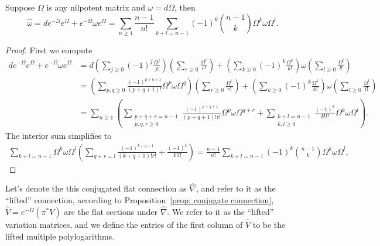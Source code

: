\begin{lemma}
Suppose $\Omega$ is any nilpotent matrix and $\omega=d \Omega$, then
\begin{equation}\label{eq:OmegaHatFormula}
\widehat{\omega}=d e^{-\Omega}e^\Omega+e^{-\Omega}\omega e^\Omega=\sum_{n\geq1}\frac{n-1}{n!}\sum_{k+l=n-1}(-1)^{k}\binom{n-1}{k}\Omega^{k}\omega\Omega^{l}.
\end{equation}
\end{lemma}
\begin{proof} First we compute
\begin{equation}
\begin{aligned}
d e^{-\Omega}e^\Omega+e^{-\Omega}\omega e^\Omega&=d\left(\sum_{j\geq0}(-1)^j\frac{\Omega^j}{j!}\right)\left(\sum_{r\geq0}\frac{\Omega^r}{r!}\right)+\left(\sum_{k\geq0}(-1)^k\frac{\Omega^k}{k!}\right)\omega\left(\sum_{l\geq0}\frac{\Omega^l}{l!}\right) \\
&=\left(\sum_{p,q\geq0}\frac{(-1)^{p+q+1}}{(p+q+1)!}\Omega^p\omega\Omega^q\right)\left(\sum_{r\geq0}\frac{\Omega^r}{r!}\right)+\left(\sum_{k\geq0}(-1)^k\frac{\Omega^k}{k!}\right)\omega\left(\sum_{l\geq0}\frac{\Omega^l}{l!}\right) \\
&=\sum_{n\geq1}\left(\sum_{\substack{p+q+r=n-1\\p,q,r\geq0}}\frac{(-1)^{p+q+1}}{(p+q+1)!r!}\Omega^p\omega\Omega^{q+r}+\sum_{\substack{k+l=n-1\\k,l\geq0}}\frac{(-1)^k}{k!l!}\Omega^k\omega\Omega^l\right).
\end{aligned}
\end{equation}
The interior sum simplifies to
\begin{equation}
\begin{aligned}
\sum_{k+l=n-1}\Omega^k\omega\Omega^l\left(\sum_{q+r=l}\frac{(-1)^{k+q+1}}{(k+q+1)!r!}+\frac{(-1)^k}{k!l!}\right)
=\frac{n-1}{n!}\sum_{k+l=n-1}(-1)^{k}\binom{n-1}{k}\Omega^k\omega\Omega^l,
\end{aligned}
\end{equation}
\end{proof}

Let's denote the this conjugated flat connection as $\widehat \nabla$, and refer to it as the ``lifted'' connection, according to Proposition~\ref{prop: conjugate connection},  $\widehat V=e^{-\Omega}(\pi^*V)$ are the flat sections under $\widehat\nabla$. We refer to it as the ``lifted'' variation matrices, and we define the entries of the first column of $\widehat V$ to be the lifted multiple polylogarithms.

